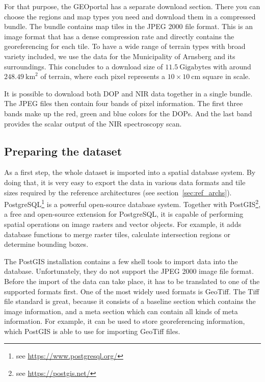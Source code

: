 For that purpose, the GEOportal has a separate download section. There you can choose the regions and map types you need and download them in a compressed bundle. The bundle contains map tiles in the JPEG 2000 file format. This is an image format that has a dense compression rate and directly contains the georeferencing for each tile. To have a wide range of terrain types with broad variety included, we use the data for the Municipality of Arnsberg and its surroundings. This concludes to a download size of $11.5~\text{Gigabytes}$ with around $248.49~\text{km}^2$ of terrain, where each pixel represents a $10\times 10~\text{cm}$ square in scale.

It is possible to download both DOP and NIR data together in a single bundle. The JPEG files then contain four bands of pixel information. The first three bands make up the red, green and blue colors for the DOPs. And the last band provides the scalar output of the NIR spectroscopy scan.


\subsection{Preparing the dataset}
As a first step, the whole dataset is imported into a spatial database system. By doing that, it is very easy to export the data in various data formats and tile sizes required by the reference architectures (see section~\ref{sec:ref_archs}). PostgreSQL\footnote{see \url{https://www.postgresql.org/}} is a powerful open-source database system. Together with PostGIS\footnote{see \url{https://postgis.net/}}, a free and open-source extension for PostgreSQL, it is capable of performing spatial operations on image rasters and vector objects. For example, it adds database functions to merge raster tiles, calculate intersection regions or determine bounding boxes.

The PostGIS installation contains a few shell tools to import data into the database. Unfortunately, they do not support the JPEG 2000 image file format. Before the import of the data can take place, it has to be translated to one of the supported formats first. One of the most widely used formats is GeoTiff. The Tiff file standard is great, because it consists of a baseline section which contains the image information, and a meta section which can contain all kinds of meta information. For example, it can be used to store georeferencing information, which PostGIS is able to use for importing GeoTiff files.

